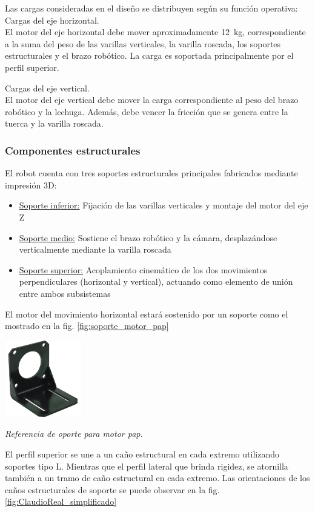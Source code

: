 Las cargas consideradas en el diseño se distribuyen según su función operativa:\\

Cargas del eje horizontal.\\
\noindent
El motor del eje horizontal debe mover aproximadamente 12~kg, correspondiente a la suma del peso de las varillas verticales, la varilla roscada, los soportes estructurales y el brazo robótico. La carga es soportada principalmente por el perfil superior.

Cargas del eje vertical.\\
\noindent
El motor del eje vertical debe mover la carga correspondiente al peso del brazo robótico y la lechuga. Además, debe vencer la fricción que se genera entre la tuerca y la varilla roscada.

\subsubsection{Componentes estructurales}

El robot cuenta con tres soportes estructurales principales fabricados mediante impresión 3D:

\begin{itemize}[label=$\bullet$]
    \item \underline{Soporte inferior:} Fijación de las varillas verticales y montaje del motor del eje Z
    \item \underline{Soporte medio:} Sostiene el brazo robótico y la cámara, desplazándose verticalmente mediante la varilla roscada
    \item \underline{Soporte superior:} Acoplamiento cinemático de los dos movimientos perpendiculares (horizontal y vertical), actuando como elemento de unión entre ambos subsistemas
\end{itemize}

El motor del movimiento horizontal estará sostenido por un soporte como el mostrado en la fig. \ref{fig:soporte_motor_pap}
\begin{table}[H]
\centering
\includegraphics[width=0.25\textwidth]{img/soporte_motor_pap.png}
\caption{\textit{Referencia de oporte para motor pap.}}
\label{fig:soporte_motor_pap}
\end{table}
El perfil superior se une a un caño estructural en cada extremo utilizando soportes tipo L. Mientras que el perfil lateral que brinda rigidez, se atornilla también a un tramo de caño estructural en cada extremo. Las orientaciones de los caños estructurales de soporte se puede observar en la fig. \ref{fig:ClaudioReal_simplificado}